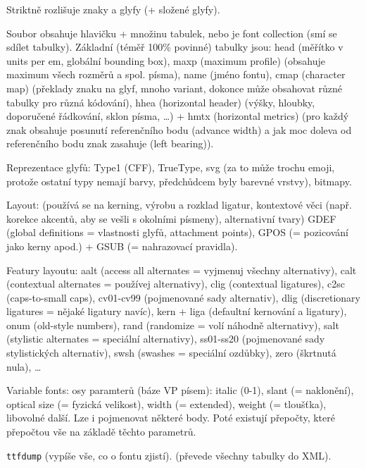 \documentclass[12pt]{article}					%
\begin{document}
    \begin{definice}[OpenType]
        Striktně rozlišuje znaky a glyfy (+ složené glyfy).

        Soubor obsahuje hlavičku + množinu tabulek, nebo je font collection (smí se sdílet tabulky). Základní (téměř 100\% povinné) tabulky jsou: head (měřítko v units per em, globální bounding box), maxp (maximum profile) (obsahuje maximum všech rozměrů a spol. písma), name (jméno fontu), cmap (character map) (překlady znaku na glyf, mnoho variant, dokonce může obsahovat různé tabulky pro různá kódování), hhea (horizontal header) (výšky, hloubky, doporučené řádkování, sklon písma, …) + hmtx (horizontal metrics) (pro každý znak obsahuje posunutí referenčního bodu (advance width) a jak moc doleva od referenčního bodu znak zasahuje (left bearing)).

        Reprezentace glyfů: Type1 (CFF), TrueType, svg (za to může trochu emoji, protože ostatní typy nemají barvy, předchůdcem byly barevné vrstvy), bitmapy.

        Layout: (používá se na kerning, výrobu a rozklad ligatur, kontextové věci (např. korekce akcentů, aby se vešli s okolními písmeny), alternativní tvary) GDEF (global definitions = vlastnosti glyfů, attachment points), GPOS (= pozicování jako kerny apod.) + GSUB (= nahrazovací pravidla).

        Featury layoutu: aalt (access all alternates = vyjmenuj všechny alternativy), calt (contextual alternates = používej alternativy), clig (contextual ligatures), c2sc (caps-to-small caps), cv01-cv99 (pojmenované sady alternativ), dlig (discretionary ligatures = nějaké ligatury navíc), kern + liga (defaultní kernování a ligatury), onum (old-style numbers), rand (randomize = volí náhodně alternativy), salt (stylistic alternates = speciální alternativy), ss01-ss20 (pojmenované sady stylistických alternativ), swsh (swashes = speciální ozdůbky), zero (škrtnutá nula), …

        Variable fonts: osy paramterů (báze VP písem): italic (0-1), slant (= naklonění), optical size (= fyzická velikost), width (= extended), weight (= tloušťka), libovolné další. Lze i pojmenovat některé body. Poté existují přepočty, které přepočtou vše na základě těchto parametrů.
    \end{definice}

    \begin{definice}
        \verb|ttfdump| (vypíše vše, co o fontu zjistí). \verb|| (převede všechny tabulky do XML).
    \end{definice}
\end{document}

